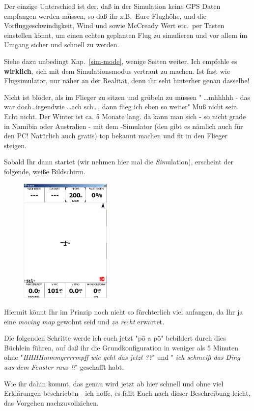 Der einzige Unterschied ist der, daß in der Simulation keine GPS Daten empfangen werden müssen, so daß ihr z.B.\ Eure Flughöhe, und die Vorfluggeschwindigkeit, Wind und sowie McCready Wert etc.\ per Tasten einstellen könnt, um einen echten geplanten Flug zu simulieren und vor allem im Umgang sicher und schnell zu werden.


Siehe dazu unbedingt Kap.~\ref{sim-mode}, wenige Seiten weiter. Ich empfehle es \textbf{wirklich}, sich mit dem Simulationsmodus vertraut zu machen. Ist fast wie Flugsimulator, nur näher an der Realität, denn ihr seht hinterher genau dasselbe!

Nicht ist blöder, als im Flieger zu sitzen und grübeln zu müssen " \dots  mhhhhh -  das war doch\dots  irgendwie \dots ach sch\dots , dann flieg ich eben so weiter" Muß nicht sein. Echt nicht.  Der Winter ist ca. 5 Monate lang. da kann man sich - so nicht grade in Namibia oder Australien - mit dem \xc -Simulator (den gibt es nämlich auch für den PC! Natürlich auch gratis) top bekannt machen und fit in den Flieger steigen.

Sobald Ihr \xc dann startet (wir nehmen hier mal die \textsl{Sim}ulation), erscheint der folgende, weiße Bildschirm.


\begin{figure}
\includegraphics[width=4.5cm]{Bilder/veryfirst.png}
\end{figure}
Hiermit könnt Ihr im Prinzip noch nicht so fürchterlich viel anfangen, da Ihr ja eine \textsl{moving map} gewohnt seid und \textsl{zu recht} erwartet.

Die folgenden Schritte werde ich euch jetzt "pö a pö" bebildert durch dies Büchlein führen, auf daß ihr die Grundkonfiguration in weniger als 5 Minuten ohne "\textsl{HHHHmmmgrrrrmpff wie geht das jetzt ??}"  und " \textsl{ich schmeiß das Ding aus  dem Fenster raus !!}"  geschafft habt.

 Wie ihr dahin kommt, das genau wird jetzt ab hier schnell und ohne viel Erklärungen beschrieben  - ich hoffe, es fällt Euch nach dieser Beschreibung leicht, das Vorgehen nachzuvollziehen.\\

